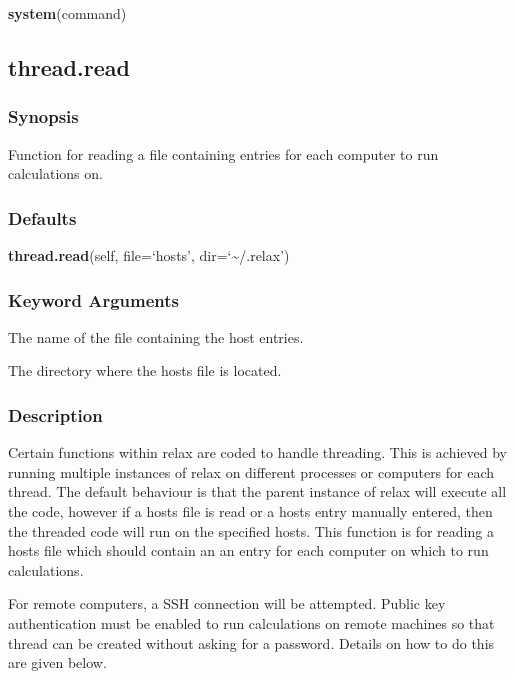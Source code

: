 \textsf{\textbf{system}(command)}



\newpage

\subsection{thread.read}


\subsubsection{Synopsis}

Function for reading a file containing entries for each computer to run calculations on.

\subsubsection{Defaults}

\textsf{\textbf{thread.read}(self, file=`hosts', dir=`\~{}/.relax')}


\subsubsection{Keyword Arguments}


  The name of the file containing the host entries.

  The directory where the hosts file is located.

\subsubsection{Description}

Certain functions within relax are coded to handle threading.  This is achieved by running
multiple instances of relax on different processes or computers for each thread.  The
default behaviour is that the parent instance of relax will execute all the code, however if
a hosts file is read or a hosts entry manually entered, then the threaded code will run on
the specified hosts.  This function is for reading a hosts file which should contain an
an entry for each computer on which to run calculations.

For remote computers, a SSH connection will be attempted.  Public key authentication must be
enabled to run calculations on remote machines so that thread can be created without asking
for a password.  Details on how to do this are given below.



